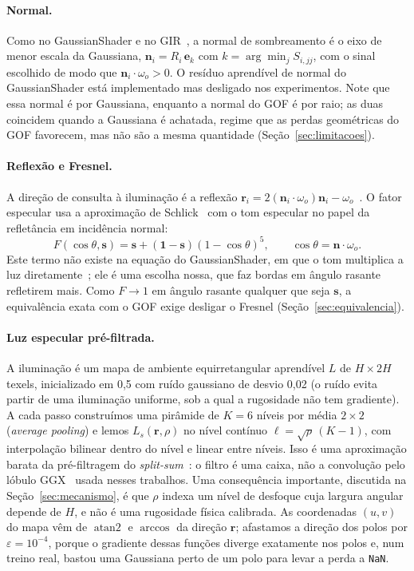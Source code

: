 \documentclass[12pt]{article}
\newcommand{\bn}{\mathbf{n}}
\newcommand{\br}{\mathbf{r}}
\newcommand{\bs}{\mathbf{s}}
\begin{document}
\paragraph{Normal.}
Como no GaussianShader e no GIR~\cite{jiang2024gaussianshader,shi2025gir}, a normal de sombreamento é o eixo de menor escala da Gaussiana, $\bn_i=R_i\,\mathbf{e}_k$ com $k=\arg\min_j S_{i,jj}$, com o sinal escolhido de modo que $\bn_i\cdot\omega_o>0$.
O resíduo aprendível de normal do GaussianShader está implementado mas desligado nos experimentos.
Note que essa normal é por Gaussiana, enquanto a normal do GOF é por raio; as duas coincidem quando a Gaussiana é achatada, regime que as perdas geométricas do GOF favorecem, mas não são a mesma quantidade (Seção~\ref{sec:limitacoes}).

\paragraph{Reflexão e Fresnel.}
A direção de consulta à iluminação é a reflexão $\br_i=2(\bn_i\cdot\omega_o)\bn_i-\omega_o$~\cite{verbin2022refnerf}.
O fator especular usa a aproximação de Schlick~\cite{schlick1994fresnel} com o tom especular no papel da refletância em incidência normal:
\begin{equation}
F(\cos\theta,\bs)=\bs+(\mathbf{1}-\bs)(1-\cos\theta)^5,\qquad \cos\theta=\bn\cdot\omega_o .
\label{eq:fresnel}
\end{equation}
Este termo não existe na equação do GaussianShader, em que o tom multiplica a luz diretamente~\cite{jiang2024gaussianshader}; ele é uma escolha nossa, que faz bordas em ângulo rasante refletirem mais.
Como $F\to 1$ em ângulo rasante qualquer que seja $\bs$, a equivalência exata com o GOF exige desligar o Fresnel (Seção~\ref{sec:equivalencia}).

\paragraph{Luz especular pré-filtrada.}
A iluminação é um mapa de ambiente equirretangular aprendível $L$ de $H\times 2H$ texels, inicializado em 0,5 com ruído gaussiano de desvio 0,02 (o ruído evita partir de uma iluminação uniforme, sob a qual a rugosidade não tem gradiente).
A cada passo construímos uma pirâmide de $K=6$ níveis por média $2\times 2$ (\emph{average pooling}) e lemos $L_s(\br,\rho)$ no nível contínuo $\ell=\sqrt{\rho}\,(K-1)$, com interpolação bilinear dentro do nível e linear entre níveis.
Isso é uma aproximação barata da pré-filtragem do \emph{split-sum}~\cite{karis2013ue4,munkberg2022nvdiffrec}: o filtro é uma caixa, não a convolução pelo lóbulo GGX~\cite{walter2007ggx} usada nesses trabalhos.
Uma consequência importante, discutida na Seção~\ref{sec:mecanismo}, é que $\rho$ indexa um nível de desfoque cuja largura angular depende de $H$, e não é uma rugosidade física calibrada.
As coordenadas $(u,v)$ do mapa vêm de $\operatorname{atan2}$ e $\arccos$ da direção $\br$; afastamos a direção dos polos por $\varepsilon=10^{-4}$, porque o gradiente dessas funções diverge exatamente nos polos e, num treino real, bastou uma Gaussiana perto de um polo para levar a perda a \texttt{NaN}.
\end{document}

